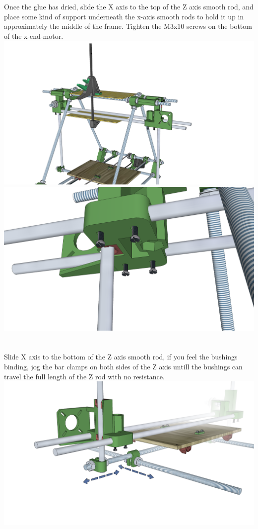 \documentclass[twoside,openany,a4paper,titlepage]{memoir}
\begin{document}
	\section{}
	Once the glue has dried, slide the X axis to the top of the Z axis smooth rod, and place some kind of support 		underneath the x-axis smooth rods to hold it up in approximately the middle of the frame.
	Tighten the M3x10 screws on the bottom of the x-end-motor.\\
	\includegraphics[width=1\linewidth]{graphics/ch8_14_1.png}
	\includegraphics[width=1\linewidth]{graphics/ch8_14_2.png}
	
	\section{}
	Slide X axis to the bottom of the Z axis smooth rod, if you feel the
	bushings binding, jog the bar clamps on both sides of the Z axis untill
	the bushings can travel the full length of the Z rod with no resistance.\\
	\includegraphics[width=1\linewidth]{graphics/ch8_15.png}
	
\end{document}
